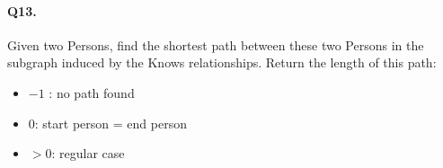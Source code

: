 \paragraph{Q13.}
Given two Persons, find the shortest path between these two Persons in
the subgraph induced by the Knows relationships.
Return the length of this path:
\begin{itemize}
\tightlist
\item
  \(-1\) : no path found
\item
  \(0\): start person = end person
\item
  \(> 0\): regular case
\end{itemize}
